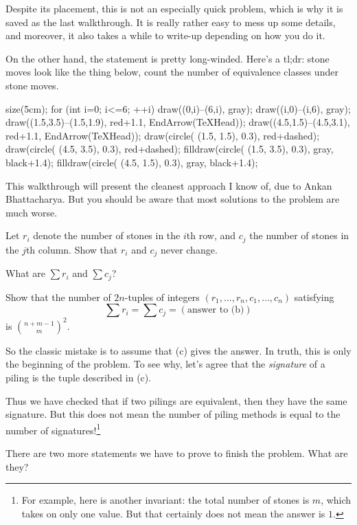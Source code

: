 \begin{walkthrough}
	Despite its placement, this is not an especially quick problem,
	which is why it is saved as the last walkthrough.
	It is really rather easy to mess up some details,
	and moreover, it also takes a while to write-up depending on how you do it.

	On the other hand, the statement is pretty long-winded.
	Here's a tl;dr: stone moves look like the thing below,
	count the number of equivalence classes under stone moves.
	\begin{center}
		\begin{asy}
			size(5cm);
			for (int i=0; i<=6; ++i) {
					draw((0,i)--(6,i), gray);
					draw((i,0)--(i,6), gray);
				}
			draw((1.5,3.5)--(1.5,1.9), red+1.1, EndArrow(TeXHead));
			draw((4.5,1.5)--(4.5,3.1), red+1.1, EndArrow(TeXHead));
			draw(circle( (1.5, 1.5), 0.3), red+dashed);
			draw(circle( (4.5, 3.5), 0.3), red+dashed);
			filldraw(circle( (1.5, 3.5), 0.3), gray, black+1.4);
			filldraw(circle( (4.5, 1.5), 0.3), gray, black+1.4);
		\end{asy}
	\end{center}

	This walkthrough will present the cleanest approach I know of,
	due to Ankan Bhattacharya.
	But you should be aware that most solutions to the problem are much worse.

	\begin{walk}
		\ii Let $r_i$ denote the number of stones in the $i$th row,
		and $c_j$ the number of stones in the $j$th column.
		Show that $r_i$ and $c_j$ never change.

		\ii What are $\sum r_i$ and $\sum c_j$?

		\ii Show that the number of $2n$-tuples of integers
		$(r_1, \dots, r_n, c_1, \dots, c_n)$ satisfying
		\[ \sum r_i = \sum c_j = (\text{answer to (b)}) \]
		is $\binom{n+m-1}{m}^2$.
	\end{walk}
	So the classic mistake is to assume that (c) gives the answer.
	In truth, this is only the beginning of the problem.
	To see why, let's agree that the \emph{signature}
	of a piling is the tuple described in (c).

	Thus we have checked that if two pilings are equivalent,
	then they have the same signature.
	But this does not mean the number of piling methods
	is equal to the number of signatures!\footnote{For example,
		here is another invariant:
		the total number of stones is $m$, which takes on only one value.
		But that certainly does not mean the answer is $1$.}
	\begin{walk}[resume]
		\ii There are two more statements we have to prove
		to finish the problem. What are they?
	\end{walk}


\end{walkthrough}
